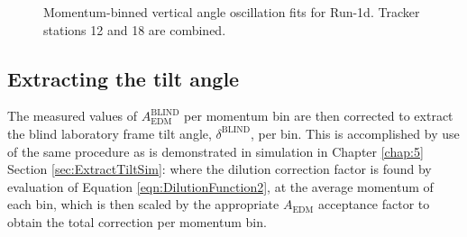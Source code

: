 \begin{figure}[]
\caption{Momentum-binned vertical angle oscillation fits for Run-1d. Tracker stations 12 and 18 are combined.}
\label{fig:Run1dMomBinnedFits}
\end{figure}
\clearpage


\subsection{Extracting the tilt angle}\label{sec:ExtractTiltData}

The measured values of $A_{\text{EDM}}^{\text{BLIND}}$ per momentum bin are then corrected to extract the blind laboratory frame tilt angle, $\delta^{\text{BLIND}}$, per bin. This is accomplished by use of the same procedure as is demonstrated in simulation in Chapter \ref{chap:5} Section \ref{sec:ExtractTiltSim}: where the dilution correction factor is found by evaluation of Equation \ref{eqn:DilutionFunction2}, at the average momentum of each bin, which is then scaled by the appropriate $A_{\text{EDM}}$ acceptance factor to obtain the total correction per momentum bin. %

